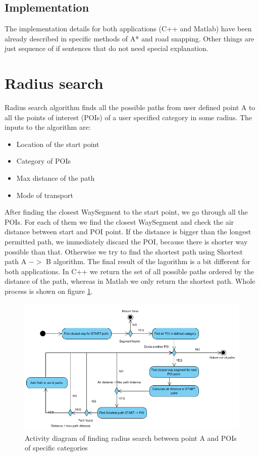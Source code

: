 \documentclass[reqno,openany,12pt]{amsbook}
\theoremstyle{definition}
\theoremstyle{remark}
\begin{document}
 \subsection{Implementation}
 The implementation details for both applications (C++ and Matlab) have been already described in specific methods of A* and road snapping. Other things are just sequence of if sentences that do not need special explanation.
\section{Radius search}
Radius search algorithm finds all the possible paths from user defined point A to all the points of interest (POIs) of a user specified category in some radius. The inputs to the algorithm are:
\begin{itemize}
\item Location of the start point
\item Category of POIs
\item Max distance of the path
\item Mode of transport
\end{itemize}
After finding the closest WaySegment to the start point, we go through all the POIs. For each of them we find the closest WaySegment and check the air distance between start and POI point. If the distance is bigger than the longest permitted path, we immediately discard the POI, because there is shorter way possible than that. Otherwise we try to find the shortest path using Shortest path A $->$ B algorithm. The final result of the lagorithm is a bit different for both applications. In C++ we return the set of all possible paths ordered by the distance of the path, whereas in Matlab we only return the shortest path. Whole process is shown on figure \ref{fig:radius_activity}.    
 \begin{figure}[h]
 \centering
 \includegraphics[width=0.7\linewidth]{../photos/shortest_path_radius.png}
 \caption{Activity diagram of finding radius search between point A and POIs of specific categories}
 \label{fig:radius_activity}
 \end{figure}
\end{document}
